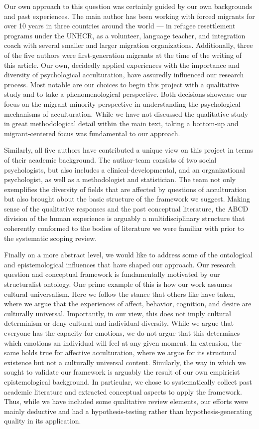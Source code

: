 \documentclass[man, 12pt, a4paper]{apa7}
\begin{document}
Our own approach to this question was certainly guided by our own backgrounds and past experiences. The main author has been working with forced migrants for over 10 years in three countries around the world --- in refugee resettlement programs under the UNHCR, as a volunteer, language teacher, and integration coach with several smaller and larger migration organizations. Additionally, three of the five authors were first-generation migrants at the time of the writing of this article. Our own, decidedly applied experiences with the importance and diversity of psychological acculturation, have assuredly influenced our research process. Most notable are our choices to begin this project with a qualitative study and to take a phenomenological perspective. Both decisions showcase our focus on the migrant minority perspective in understanding the psychological mechanisms of acculturation. While we have not discussed the qualitative study in great methodological detail within the main text, taking a bottom-up and migrant-centered focus was fundamental to our approach.

Similarly, all five authors have contributed a unique view on this project in terms of their academic background. The author-team consists of two social psychologists, but also includes a clinical-developmental, and an organizational psychologist, as well as a methodologist and statistician. The team not only exemplifies the diversity of fields that are affected by questions of acculturation but also brought about the basic structure of the framework we suggest. Making sense of the qualitative responses and the past conceptual literature, the ABCD division of the human experience is arguably a multidisciplinary structure that coherently conformed to the bodies of literature we were familiar with prior to the systematic scoping review. 

Finally on a more abstract level, we would like to address some of the ontological and epistemological influences that have shaped our approach. Our research question and conceptual framework is fundamentally motivated by our structuralist ontology. One prime example of this is how our work assumes cultural universalism. Here we follow the stance that others like \citet[][]{Berry2009a} have taken, where we argue that the experiences of affect, behavior, cognition, and desire are culturally universal. Importantly, in our view, this does not imply cultural determinism or deny cultural and individual diversity. While we argue that everyone has the capacity for emotions, we do not argue that this determines which emotions an individual will feel at any given moment. In extension, the same holds true for affective acculturation, where we argue for its structural existence but not a culturally universal content. Similarly, the way in which we sought to validate our framework is arguably the result of our own empiricist epistemological background. In particular, we chose to systematically collect past academic literature and extracted conceptual aspects to apply the framework. Thus, while we have included some qualitative review elements, our efforts were mainly deductive and had a hypothesis-testing rather than hypothesis-generating quality in its application.

\printbibliography
\end{document}
